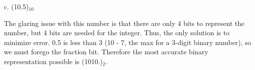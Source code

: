 \documentclass[12pt]{book}
\newenvironment{indented}[1] {
	\begin{list}{}{\setlength{\leftmargin}{#1}}
		\item[]
}{\end{list}}
\begin{document}
	\begin{indented}{5mm}
		c. (10.5)$_{10}$
		\begin{indented}{5mm}
			The glaring issue with this number is that there are only 4 bits to represent the
			number, but 4 bits are needed for the integer. Thus, the only solution is to minimize
			error. 0.5 is less than 3 (10 - 7, the max for a 3-digit binary
			number), so we must forego the fraction bit. Therefore the most accurate binary
			representation possible is (1010.)$_2$.
		\end{indented}
	\end{indented}
\end{document}
